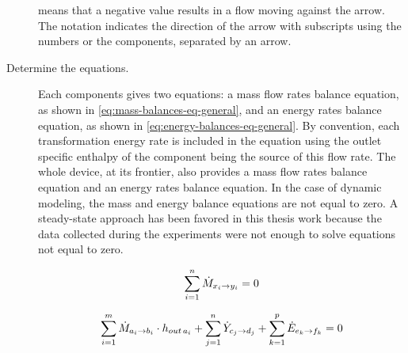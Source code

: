 \begin{description}
  means that a negative value results in a flow moving against the
  arrow. The notation indicates the direction of the arrow with
  subscripts using the numbers or the components, separated by an
  arrow.
\item[Determine the equations.] Each components gives two equations: a
  mass flow rates balance equation, as shown in
  \cref{eq:mass-balances-eq-general}, and an energy rates balance
  equation, as shown in \cref{eq:energy-balances-eq-general}. By
  convention, each transformation energy rate is included in the equation using the outlet
  specific enthalpy of the component being the
  source of this flow rate. The whole device, at its frontier, also
  provides a mass flow rates balance equation and an energy rates
  balance equation. In the case of dynamic modeling, the mass and
  energy balance equations are not equal to zero. A steady-state
  approach has been favored in this thesis work because the data
  collected during the experiments were not enough to solve equations
  not equal to zero.

\begin{equation}
  \label{eq:mass-balances-eq-general}
  \sum^n_{i=1} \dot{M}_{x_i \rightarrow y_i} = 0
  \tagaddtextone{$\left[\si{\watt}\right]$}
\end{equation}

\begin{equation}
  \label{eq:energy-balances-eq-general}
  \sum^m_{i=1} \dot{M}_{a_i \rightarrow b_i} \cdot h_{out\,a_i} +
  \sum^n_{j=1}\dot{Y}_{c_j \rightarrow d_j} +
  \sum^p_{k=1}\dot{E}_{e_k \rightarrow f_k} = 0
  \tagaddtextone{$\left[\si{\watt}\right]$}
\end{equation}


\end{description}
